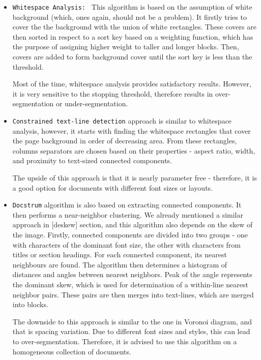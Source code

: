 \begin{itemize}
\item\texttt{Whitespace Analysis: } This algorithm is based on the assumption of white background (which, ones again, should not be a problem). It firstly tries to cover the the background with the union of white rectangles. These covers are then sorted in respect to a sort key based on a weighting function, which has the purpose of assigning higher weight to taller and longer blocks. Then, covers are added to form background cover until the sort key is less than the threshold.

Most of the time, whitespace analysis provides satisfactory results. However, it is very sensitive to the stopping threshold, therefore results in over-segmentation or under-segmentation.

\item\texttt{Constrained text-line detection} approach is similar to whitespace analysis, however, it starts with finding the whitespace rectangles that cover the page background in order of decreasing area. From these rectangles, columns separators are chosen based on their properties - aspect ratio, width, and proximity to text-sized connected components.

The upside of this approach is that it is nearly parameter free - therefore, it is a good option for documents with different font sizes or layouts.

\item\texttt{Docstrum} algorithm is also based on extracting connected components. It then performs a near-neighbor clustering. We already mentioned a similar approach in [deskew] section, and this algorithm also depends on the skew of the image. Firstly, connected components are divided into two groups - one with characters of the dominant font size, the other with characters from titles or section headings. For each connected component, its nearest neighbours are found. The algorithm then determines a histogram of distances and angles between nearest neighbors. Peak of the angle represents the dominant skew, which is used for determination of a within-line nearest neighbor pairs. These pairs are then merges into text-lines, which are merged into blocks.

The downside to this approach is similar to the one in Voronoi diagram, and that is spacing variation. Due to different font sizes and styles, this can lead to over-segmentation. Therefore, it is advised to use this algorithm on a homogeneous collection of documents.

\end{itemize}

